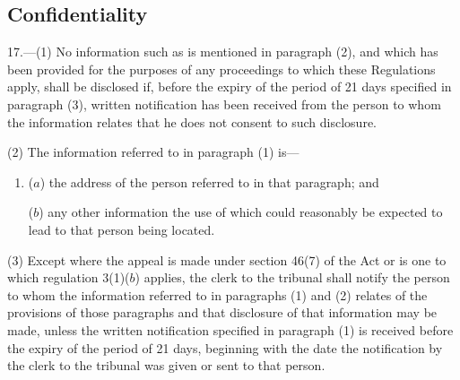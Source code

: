 \documentclass[a4paper]{article}
\begin{document}
%
%
%

\subsection[17. Confidentiality]{Confidentiality}

17.—(1) No information such as is mentioned in paragraph (2), and which has been provided for the purposes of any proceedings to which these Regulations apply, shall be disclosed if, before the expiry of the period of 21 days specified in paragraph (3), written notification has been received from the person to whom the information relates that he does not consent to such disclosure.

(2) The information referred to in paragraph (1) is—
\begin{enumerate}\item[]
($a$) the address of the person referred to in that paragraph; and

($b$) any other information the use of which could reasonably be expected to lead to that person being located.
\end{enumerate}

(3) Except where the appeal is made under section 46(7) of the Act or is one to which regulation 3(1)($b$) applies, the clerk to the tribunal shall notify the person to whom the information referred to in paragraphs (1) and (2) relates of the provisions of those paragraphs and that disclosure of that information may be made, unless the written notification specified in paragraph (1) is received before the expiry of the period of 21 days, beginning with the date the notification by the clerk to the tribunal was given or sent to that person.
\end{document}
